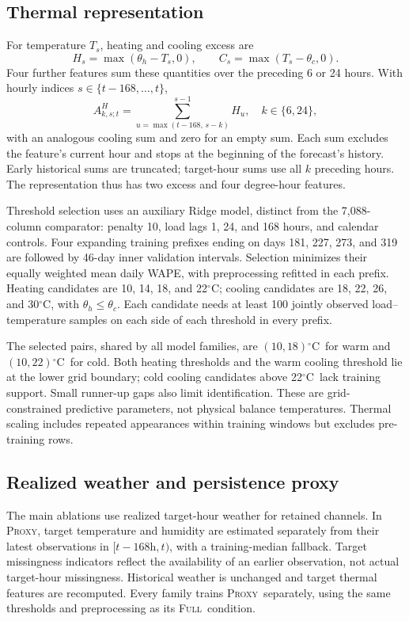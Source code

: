 \documentclass[conference]{IEEEtran}
\newcommand{\full}{\textsc{Full}}
\newcommand{\proxy}{\textsc{Proxy}}
\newcommand{\degc}{\ensuremath{^{\circ}\mathrm{C}}}
\begin{document}
\subsection{Thermal representation}
For temperature $T_s$, heating and cooling excess are
\begin{equation}
H_s=\max(\theta_h-T_s,0),\qquad
C_s=\max(T_s-\theta_c,0).
\label{eq:excess}
\end{equation}
Four further features sum these quantities over the preceding 6 or 24 hours. With hourly indices $s\in\{t-168,\ldots,t\}$,
\begin{equation}
A^H_{k,s;t}=\sum_{u=\max(t-168,\,s-k)}^{s-1}H_u,
\quad k\in\{6,24\},
\label{eq:accum}
\end{equation}
with an analogous cooling sum and zero for an empty sum. Each sum excludes the feature's current hour and stops at the beginning of the forecast's history. Early historical sums are truncated; target-hour sums use all $k$ preceding hours. The representation thus has two excess and four degree-hour features.

Threshold selection uses an auxiliary Ridge model, distinct from the 7,088-column comparator: penalty 10, load lags 1, 24, and 168 hours, and calendar controls. Four expanding training prefixes ending on days 181, 227, 273, and 319 are followed by 46-day inner validation intervals. Selection minimizes their equally weighted mean daily WAPE, with preprocessing refitted in each prefix. Heating candidates are 10, 14, 18, and 22\degc; cooling candidates are 18, 22, 26, and 30\degc, with $\theta_h\leq\theta_c$. Each candidate needs at least 100 jointly observed load--temperature samples on each side of each threshold in every prefix.

The selected pairs, shared by all model families, are $(10,18)$\degc\ for warm and $(10,22)$\degc\ for cold. Both heating thresholds and the warm cooling threshold lie at the lower grid boundary; cold cooling candidates above 22\degc\ lack training support. Small runner-up gaps also limit identification. These are grid-constrained predictive parameters, not physical balance temperatures. Thermal scaling includes repeated appearances within training windows but excludes pre-training rows.

\subsection{Realized weather and persistence proxy}
The main ablations use realized target-hour weather for retained channels. In \proxy, target temperature and humidity are estimated separately from their latest observations in $[t-168\mathrm{h},t)$, with a training-median fallback. Target missingness indicators reflect the availability of an earlier observation, not actual target-hour missingness. Historical weather is unchanged and target thermal features are recomputed. Every family trains \proxy\ separately, using the same thresholds and preprocessing as its \full\ condition.
\end{document}
